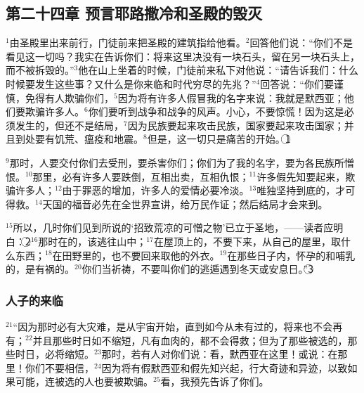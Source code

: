 \subsection{第二十四章 预言耶路撒冷和圣殿的毁灭}
$^{1}$\UL[耶稣]由圣殿里出来前行，门徒前来把圣殿的建筑指给他看。$^{2}$\UL[耶稣]回答他们说：“你们不是看见这一切吗？我实在告诉你们：将来这里决没有一块石头，留在另一块石头上，而不被拆毁的。”$^{3}$他在\UL[橄榄]山上坐着的时候，门徒前来私下对他说：“请告诉我们：什么时候要发生这些事？又什么是你来临和时代穷尽的先兆？”$^{4}$\UL[耶稣]回答说：“你们要谨慎，免得有人欺骗你们，$^{5}$因为将有许多人假冒我的名字来说：我就是默西亚；他们要欺骗许多人。$^{6}$你们要听到战争和战争的风声。小心，不要惊慌！因为这是必须发生的，但还不是结局，$^{7}$因为民族要起来攻击民族，国家要起来攻击国家；并且到处要有饥荒、瘟疫和地震。$^{8}$但是，这一切只是痛苦的开始。\textcircled{1}

$^{9}$那时，人要交付你们去受刑，要杀害你们；你们为了我的名字，要为各民族所憎恨。$^{10}$那里，必有许多人要跌倒，互相出卖，互相仇恨；$^{11}$许多假先知要起来，欺骗许多人；$^{12}$由于罪恶的增加，许多人的爱情必要冷淡。$^{13}$唯独坚持到底的，才可得救。$^{14}$天国的福音必先在全世界宣讲，给万民作证；然后结局才会来到。

$^{15}$所以，几时你们见到\UL[达尼尔]所说的‘招致荒凉的可憎之物’已立于圣地，——读者应明白：\textcircled{2}$^{16}$那时在\UL[犹太]的，该逃往山中；$^{17}$在屋顶上的，不要下来，从自己的屋里，取什么东西；$^{18}$在田野里的，也不要回来取他的外衣。$^{19}$在那些日子内，怀孕的和哺乳的，是有祸的。$^{20}$你们当祈祷，不要叫你们的逃遁遇到冬天或安息日。”\textcircled{3}


\subsubsection{人子的来临}
$^{21}$“因为那时必有大灾难，是从宇宙开始，直到如今从未有过的，将来也不会再有；$^{22}$并且那些时日如不缩短，凡有血肉的，都不会得救；但为了那些被选的，那些时日，必将缩短。$^{23}$那时，若有人对你们说：看，默西亚在这里！或说：在那里！你们不要相信，$^{24}$因为将有假默西亚和假先知兴起，行大奇迹和异迹，以致如果可能，连被选的人也要被欺骗。$^{25}$看，我预先告诉了你们。

